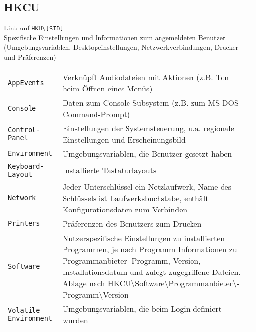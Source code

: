 \begin{multicols}{3}
\subsection{HKCU}
Link auf \texttt{HKU\textbackslash [SID]}\\
Spezifische Einstellungen und Informationen zum angemeldeten Benutzer (Umgebungsvariablen, Desktopeinstellungen, Netzwerkverbindungen, Drucker und Präferenzen)
\settowidth{\MyLen}{SID.classes.length.long.}
\begin{tabular}{@{}p{\the\MyLen}%
		@{}p{\linewidth-\the\MyLen}@{}}
	\texttt{AppEvents} & Verknüpft Audiodateien mit Aktionen (z.B. Ton beim Öffnen eines Menüs)\\
	\texttt{Console} & Daten zum Console-Subsystem (z.B. zum MS-DOS-Command-Prompt)\\
	\texttt{Control-Panel} & Einstellungen der Systemsteuerung, u.a. regionale Einstellungen und Erscheinungsbild\\
	\texttt{Environment} & Umgebungsvariablen, die Benutzer gesetzt haben\\
	\texttt{Keyboard-Layout} & Installierte Tastaturlayouts\\
	\texttt{Network} & Jeder Unterschlüssel ein Netzlaufwerk, Name des Schlüssels ist Laufwerksbuchstabe, enthält Konfigurationsdaten zum Verbinden\\
	\texttt{Printers} & Präferenzen des Benutzers zum Drucken\\
	\texttt{Software} & Nutzerspezifische Einstellungen zu installierten Programmen, je nach Programm Informationen zu Programmanbieter, Programm, Version, Installationsdatum und zulegt zugegriffene Dateien. Ablage nach HKCU\textbackslash Software\textbackslash Programmanbieter\textbackslash -Programm\textbackslash Version\\
	\texttt{Volatile Environment} & Umgebungsvariablen, die beim Login definiert wurden\\
\end{tabular}


\end{multicols}

